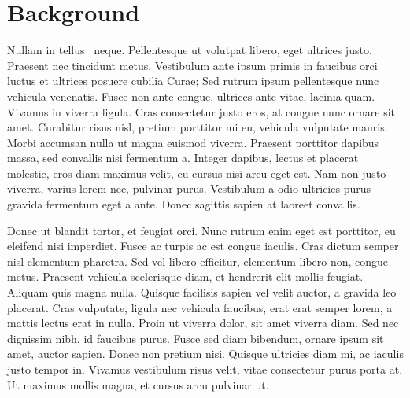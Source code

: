 \section{Background}
Nullam in tellus~\cite{testfs} neque. Pellentesque ut volutpat libero, eget
ultrices justo.  Praesent nec tincidunt metus. Vestibulum ante ipsum primis in
faucibus orci luctus et ultrices posuere cubilia Curae; Sed rutrum ipsum
pellentesque nunc vehicula venenatis. Fusce non ante congue, ultrices ante
vitae, lacinia quam.  Vivamus in viverra ligula. Cras consectetur justo eros,
at congue nunc ornare sit amet. Curabitur risus nisl, pretium porttitor mi eu,
vehicula vulputate mauris. Morbi accumsan nulla ut magna euismod viverra.
Praesent porttitor dapibus massa, sed convallis nisi fermentum a. Integer
dapibus, lectus et placerat molestie, eros diam maximus velit, eu cursus nisi
arcu eget est. Nam non justo viverra, varius lorem nec, pulvinar purus.
Vestibulum a odio ultricies purus gravida fermentum eget a ante. Donec sagittis
sapien at laoreet convallis.

Donec ut blandit tortor, et feugiat orci. Nunc rutrum enim eget est porttitor,
eu eleifend nisi imperdiet. Fusce ac turpis ac est congue iaculis. Cras dictum
semper nisl elementum pharetra. Sed vel libero efficitur, elementum libero non,
congue metus. Praesent vehicula scelerisque diam, et hendrerit elit mollis
feugiat. Aliquam quis magna nulla. Quisque facilisis sapien vel velit auctor, a
gravida leo placerat. Cras vulputate, ligula nec vehicula faucibus, erat erat
semper lorem, a mattis lectus erat in nulla. Proin ut viverra dolor, sit amet
viverra diam. Sed nec dignissim nibh, id faucibus purus. Fusce sed diam
bibendum, ornare ipsum sit amet, auctor sapien. Donec non pretium nisi. Quisque
ultricies diam mi, ac iaculis justo tempor in. Vivamus vestibulum risus velit,
vitae consectetur purus porta at. Ut maximus mollis magna, et cursus arcu
pulvinar ut.
